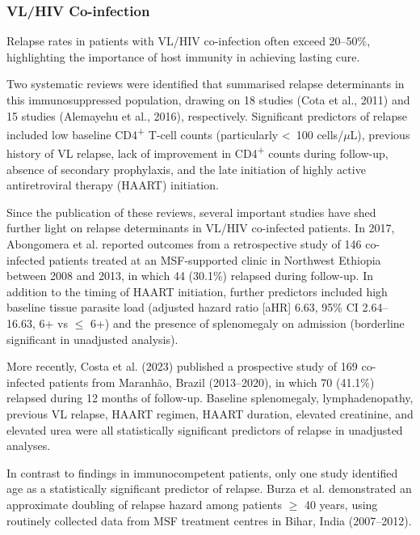 

\subsubsection{VL/HIV Co-infection}

Relapse rates in patients with VL/HIV co-infection often exceed 20--50\%\cite{cota2011, diro2019, burza2014a}, highlighting the importance of host immunity in achieving lasting cure.

Two systematic reviews were identified that summarised relapse determinants in this immunosuppressed population, drawing on 18 studies (Cota et al., 2011)\cite{cota2011} and 15 studies (Alemayehu et al., 2016)\cite{alemayehu2016}, respectively. Significant predictors of relapse included low baseline CD4\textsuperscript{+} T-cell counts (particularly <~100 cells/$\mu$L), previous history of VL relapse, lack of improvement in CD4\textsuperscript{+} counts during follow-up, absence of secondary prophylaxis, and the late initiation of highly active antiretroviral therapy (HAART) initiation.

Since the publication of these reviews, several important studies have shed further light on relapse determinants in VL/HIV co-infected patients\cite{abongomera2017a, costa2023-hiv, diro2019}. In 2017, Abongomera et al. reported outcomes from a retrospective study of 146 co-infected patients treated at an MSF-supported clinic in Northwest Ethiopia between 2008 and 2013, in which 44 (30.1\%) relapsed during follow-up. In addition to the timing of HAART initiation, further predictors included high baseline tissue parasite load (adjusted hazard ratio [aHR] 6.63, 95\% CI 2.64--16.63, 6+ vs $\leq$ 6+) and the presence of splenomegaly on admission (borderline significant in unadjusted analysis)\cite{abongomera2017a}.

More recently, Costa et al. (2023) published a prospective study of 169 co-infected patients from Maranhão, Brazil (2013--2020), in which 70 (41.1\%) relapsed during 12 months of follow-up. Baseline splenomegaly, lymphadenopathy, previous VL relapse, HAART regimen, HAART duration, elevated creatinine, and elevated urea were all statistically significant predictors of relapse in unadjusted analyses\cite{costa2023-hiv}.

In contrast to findings in immunocompetent patients, only one study identified age as a statistically significant predictor of relapse. Burza et al. demonstrated an approximate doubling of relapse hazard among patients $\geq$ 40 years, using routinely collected data from MSF treatment centres in Bihar, India (2007--2012)\cite{burza2014a}.

